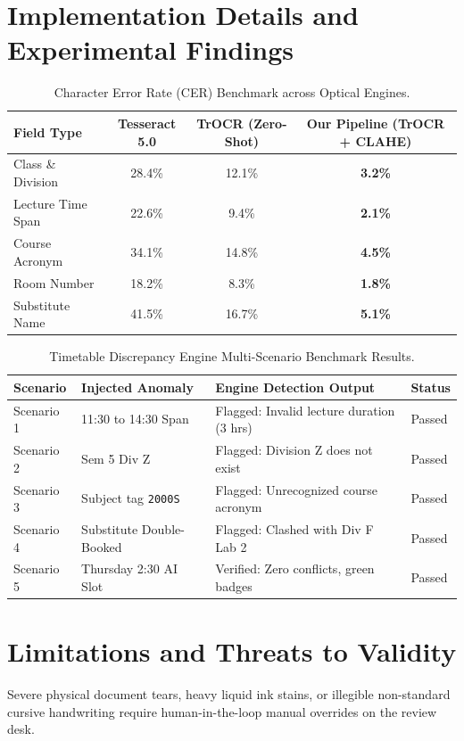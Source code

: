 \documentclass[12pt,letterpaper]{report}
\begin{document}
\section{Implementation Details and Experimental Findings}
\begin{table}[htbp]
\centering
\small
\begin{tabularx}{\textwidth}{p{4cm}ccc}
\toprule
\textbf{Field Type} & \textbf{Tesseract 5.0} & \textbf{TrOCR (Zero-Shot)} & \textbf{Our Pipeline (TrOCR + CLAHE)} \\
\midrule
Class \& Division & 28.4\% & 12.1\% & \textbf{3.2\%} \\
Lecture Time Span & 22.6\% & 9.4\% & \textbf{2.1\%} \\
Course Acronym & 34.1\% & 14.8\% & \textbf{4.5\%} \\
Room Number & 18.2\% & 8.3\% & \textbf{1.8\%} \\
Substitute Name & 41.5\% & 16.7\% & \textbf{5.1\%} \\
\bottomrule
\end{tabularx}
\caption{Character Error Rate (CER) Benchmark across Optical Engines.}
\label{tab:cer_eval}
\end{table}

\begin{table}[htbp]
\centering
\small
\begin{tabularx}{\textwidth}{lp{4cm}Xl}
\toprule
\textbf{Scenario} & \textbf{Injected Anomaly} & \textbf{Engine Detection Output} & \textbf{Status} \\
\midrule
Scenario 1 & 11:30 to 14:30 Span & Flagged: Invalid lecture duration (3 hrs) & Passed \\
Scenario 2 & Sem 5 Div Z & Flagged: Division Z does not exist & Passed \\
Scenario 3 & Subject tag \texttt{2000S} & Flagged: Unrecognized course acronym & Passed \\
Scenario 4 & Substitute Double-Booked & Flagged: Clashed with Div F Lab 2 & Passed \\
Scenario 5 & Thursday 2:30 AI Slot & Verified: Zero conflicts, green badges & Passed \\
\bottomrule
\end{tabularx}
\caption{Timetable Discrepancy Engine Multi-Scenario Benchmark Results.}
\label{tab:test_scenarios}
\end{table}

\section{Limitations and Threats to Validity}
Severe physical document tears, heavy liquid ink stains, or illegible non-standard cursive handwriting require human-in-the-loop manual overrides on the review desk.
\end{document}
